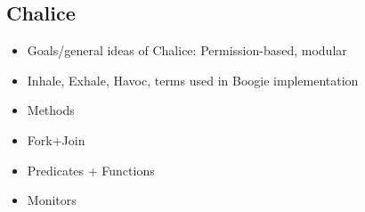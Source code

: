 
\subsection{Chalice}
\begin{sketch}
\begin{itemize}
\item Goals/general ideas of Chalice: Permission-based, modular
\item Inhale, Exhale, Havoc, terms used in Boogie implementation
\item Methods
\item Fork+Join
\item Predicates + Functions
\item Monitors
\end{itemize}
\end{sketch}